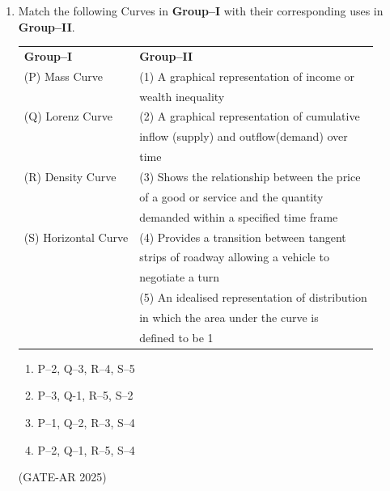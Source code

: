 \documentclass[a4paper,10pt]{article}
\begin{document}
\begin{enumerate}
\item Match the following Curves in \textbf{Group–I} with their corresponding uses in \textbf{Group–II}. \\
\begin{tabular}{ l l }
\textbf{Group–I} & \textbf{Group–II} \\
(P) Mass Curve & (1) A graphical representation of income or \\
& wealth inequality \\
(Q) Lorenz Curve & (2) A graphical representation of cumulative \\
& inflow (supply) and outflow(demand) over \\
& time \\
(R) Density Curve & (3) Shows the relationship between the price \\
& of a good or service and the quantity \\
& demanded within a specified time frame \\
(S) Horizontal Curve & (4) Provides a transition between tangent \\
& strips of roadway allowing a vehicle to \\
& negotiate a turn \\
& (5) An idealised representation of distribution \\
& in which the area under the curve is \\
& defined to be 1 \\
\end{tabular}
\begin{multicols}{2}
\begin{enumerate}
    \item P–2, Q–3, R–4, S–5
    \item P–3, Q-1, R–5, S–2
    \item P–1, Q–2, R–3, S–4
    \item P–2, Q–1, R–5, S–4
\end{enumerate}
\end{multicols}
\hfill (GATE-AR 2025)


\end{enumerate}
\end{document}
